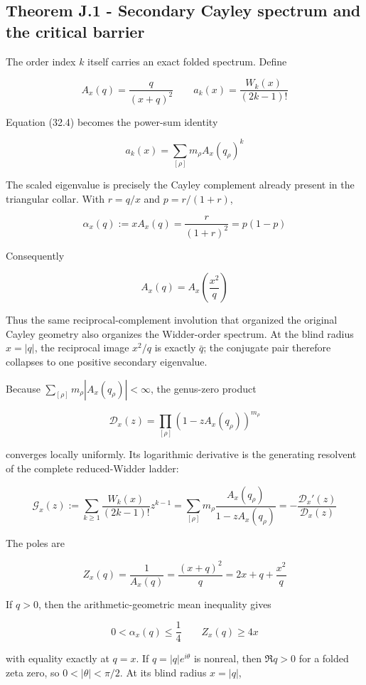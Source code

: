 \documentclass[
  11pt,
]{book}
\begin{document}
\subsection{Theorem J.1 - Secondary Cayley spectrum and the critical
barrier}\label{theorem-j.1---secondary-cayley-spectrum-and-the-critical-barrier}

The order index \(k\) itself carries an exact folded spectrum. Define

\[
A_x(q)=\frac{q}{(x+q)^2}
\qquad
a_k(x)=\frac{W_k(x)}{(2k-1)!}
\]

Equation (32.4) becomes the power-sum identity

\[
\boxed{
a_k(x)=\sum_{[\rho]}m_\rho A_x(q_\rho)^k
}
\tag{39.3}
\]

The scaled eigenvalue is precisely the Cayley complement already present
in the triangular collar. With \(r=q/x\) and \(p=r/(1+r)\),

\[
\boxed{
\alpha_x(q):=xA_x(q)
=\frac{r}{(1+r)^2}=p(1-p)
}
\tag{39.4}
\]

Consequently

\[
\boxed{
A_x(q)=A_x\!\left(\frac{x^2}{q}\right)
}
\tag{39.5}
\]

Thus the same reciprocal-complement involution that organized the
original Cayley geometry also organizes the Widder-order spectrum. At
the blind radius \(x=|q|\), the reciprocal image \(x^2/q\) is exactly
\(\bar q\); the conjugate pair therefore collapses to one positive
secondary eigenvalue.

Because \(\sum_{[\rho]}m_\rho|A_x(q_\rho)|<\infty\), the genus-zero
product

\[
\mathcal D_x(z)=
\prod_{[\rho]}\left(1-zA_x(q_\rho)\right)^{m_\rho}
\]

converges locally uniformly. Its logarithmic derivative is the
generating resolvent of the complete reduced-Widder ladder:

\[
\boxed{
\mathcal G_x(z):=
\sum_{k\ge1}\frac{W_k(x)}{(2k-1)!}z^{k-1}
=\sum_{[\rho]}m_\rho
\frac{A_x(q_\rho)}{1-zA_x(q_\rho)}
=-\frac{\mathcal D_x'(z)}{\mathcal D_x(z)}
}
\tag{39.6}
\]

The poles are

\[
Z_x(q)=\frac1{A_x(q)}
=\frac{(x+q)^2}{q}
=2x+q+\frac{x^2}{q}
\tag{39.7}
\]

If \(q>0\), then the arithmetic-geometric mean inequality gives

\[
0<\alpha_x(q)\le\frac14
\qquad
Z_x(q)\ge4x
\]

with equality exactly at \(q=x\). If \(q=|q|e^{i\theta}\) is nonreal,
then \(\Re q>0\) for a folded zeta zero, so \(0<|\theta|<\pi/2\). At its
blind radius \(x=|q|\),
\end{document}
